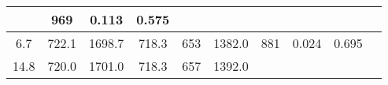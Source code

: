 \documentclass[a4paper,10pt]{article}
\begin{document}
\begin{longtable}{
     |
%    
    c|
%    
    c|
%    
    c|
%    
    c|
%    
    c|
%    
    c|
%    
    c|
%    
    c|
%    
    c|
%    
    c|
%    
    }
%        
        & 969
%        

%        

%        
        & 0.113
%        

%        

%        
        & 0.575
%        

%        
        \\
        \hline

        

%        

%        
        6.7
%        

%        

%        
        & 722.1
%        

%        

%        
        & 1698.7
%        

%        

%        
        & 718.3
%        

%        

%        
        & 653
%        

%        

%        
        & 1382.0
%        

%        

%        
        & 881
%        

%        

%        
        & 0.024
%        

%        

%        
        & 0.695
%        

%        
        \\
        \hline

        

%        

%        
        14.8
%        

%        

%        
        & 720.0
%        

%        

%        
        & 1701.0
%        

%        

%        
        & 718.3
%        

%        

%        
        & 657
%        

%        

%        
        & 1392.0
%        

%        


\end{longtable}
\end{document}
